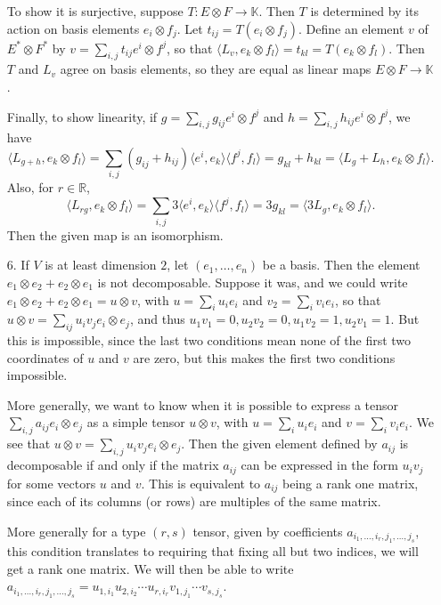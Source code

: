 \documentclass[11pt, reqno]{article}
\theoremstyle{plain}
\theoremstyle{definition}
\theoremstyle{remark}
\newcommand{\RR}{\mathbb{R}}
\begin{document}
\begin{enumerate}
    To show it is surjective, suppose $T: E \otimes F \to \mathbb{K}$. Then $T$ is determined by its action
    on basis elements $e_i \otimes f_j$. Let $t_{ij} = T(e_i \otimes f_j)$. Define an element $v$ of $E^* \otimes F^*$
    by $v = \sum_{i,j} t_{ij}e^i\otimes f^j$, so that $\langle L_v, e_k\otimes f_l\rangle = t_{kl} = T(e_k\otimes f_l)$.
    Then $T$ and $L_v$ agree on basis elements, so they are equal as linear maps $E\otimes F \to \mathbb{K}$. 

    Finally, to show linearity, if $g = \sum_{i,j}g_{ij}e^i\otimes f^j$ and $h = \sum_{i,j}h_{ij}e^i \otimes f^j$, 
    we have 
    \[
        \langle L_{g + h}, e_{k}\otimes f_{l}\rangle = \sum_{i,j}(g_{ij} + h_{ij})\langle e^i, e_k\rangle
        \langle f^j, f_l\rangle = g_{kl} + h_{kl} = \langle L_g + L_h, e_k\otimes f_l\rangle.
    \]
    Also, for $r \in \RR$,
    \[
        \langle L_{rg}, e_k\otimes f_l\rangle = \sum_{i,j}3\langle e^i, e_k\rangle \langle f^j, f_l\rangle
        = 3g_{kl} = \langle 3L_{g}, e_k\otimes f_l\rangle.
    \]
    Then the given map is an isomorphism.

    \item[6.] If $V$ is at least dimension $2$, let $(e_1, \dots, e_n)$ be a basis. Then 
    the element $e_1\otimes e_2 + e_2 \otimes e_1$ is not decomposable. Suppose it was, and we could 
    write $e_1 \otimes e_2 + e_2 \otimes e_1 = u\otimes v$, with $u = \sum_{i}u_i e_i$ 
    and $v_2 = \sum_{i} v_i e_i$, so that $u \otimes v = \sum_{ij}u_i v_j e_i \otimes e_j$, and thus
    $u_1 v_1 = 0, u_2 v_2 = 0, u_1 v_2 = 1, u_2 v_1 = 1$. But this is impossible, since the last two
    conditions mean none of the first two coordinates of $u$ and $v$ are zero, but this makes 
    the first two conditions impossible. 

    More generally, we want to know when it is possible to express a tensor $\sum_{i,j}a_{ij}e_i \otimes e_j$
    as a simple tensor $u\otimes v$, with $u = \sum_{i}u_i e_i$ and $v = \sum_{i} v_i e_i$. 
    We see that $u\otimes v = \sum_{i,j}u_i v_j e_i\otimes e_j$. Then the given element defined
    by $a_{ij}$ is decomposable if and only if the matrix $a_{ij}$ can be expressed in the form 
    $u_i v_j$ for some vectors $u$ and $v$. This is equivalent to $a_{ij}$ being a rank one matrix,
    since each of its columns (or rows) are multiples of the same matrix. 

    More generally for a type $(r,s)$ tensor, given by coefficients $a_{i_1, \dots, i_{r}, j_1, \dots, j_s}$,
    this condition translates to requiring that fixing all but two indices, we will get a rank one matrix.
    We will then be able to write $a_{i_1,\dots, i_r, j_1,\dots, j_s} = u_{1,i_1}u_{2, i_2}\cdots u_{r, i_r}
    v_{1, j_1}\cdots v_{s, j_s}$. 

\end{enumerate}
\end{document}

